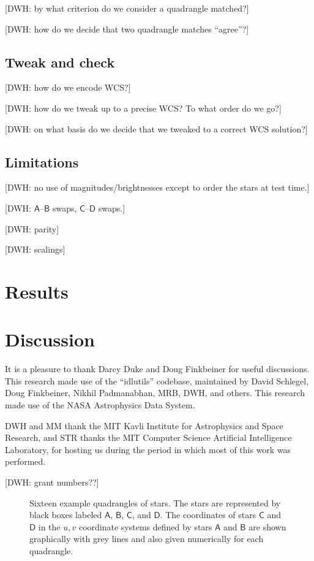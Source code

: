 \documentclass[12pt,preprint]{aastex}
\newcommand{\starlabel}[1]{\mathsf{#1}}
\newcommand{\AAA}{\starlabel{A}}
\newcommand{\BBB}{\starlabel{B}}
\newcommand{\CCC}{\starlabel{C}}
\newcommand{\DDD}{\starlabel{D}}
\begin{document}
[DWH: by what criterion do we consider a quadrangle matched?]

[DWH: how do we decide that two quadrangle matches ``agree''?]

\subsection{Tweak and check}

[DWH: how do we encode WCS?]

[DWH: how do we tweak up to a precise WCS?  To what order do we go?]

[DWH: on what basis do we decide that we tweaked to a correct WCS
  solution?]

\subsection{Limitations}

[DWH: no use of magnitudes/brightnesses except to order the stars at
  test time.]

[DWH: $\AAA$--$\BBB$ swaps, $\CCC$--$\DDD$ swaps.]

[DWH: parity]

[DWH: scalings]

\section{Results}

\section{Discussion}

\acknowledgements
It is a pleasure to thank Darcy Duke and Doug Finkbeiner for useful
discussions.  This research made use of the ``idlutils'' codebase,
maintained by David Schlegel, Doug Finkbeiner, Nikhil Padmanabhan,
MRB, DWH, and others.  This research made use of the NASA Astrophysics
Data System.

DWH and MM thank the MIT Kavli Institute for Astrophysics and Space
Research, and STR thanks the MIT Computer Science Artificial
Intelligence Laboratory, for hosting us during the period in which
most of this work was performed.

[DWH: grant numbers??]




\clearpage
\begin{figure}
\caption{Sixteen example quadrangles of stars.  The stars are
  represented by black boxes labeled $\AAA$, $\BBB$, $\CCC$, and
  $\DDD$.  The coordinates of stars $\CCC$ and $\DDD$ in the $u,v$
  coordinate systems defined by stars $\AAA$ and $\BBB$ are shown
  graphically with grey lines and also given numerically for each
  quadrangle.\label{fig:quad}}
\end{figure}
\end{document}
